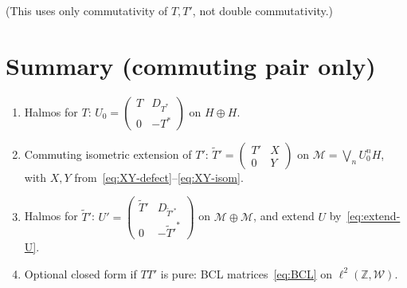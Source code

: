 \documentclass[11pt]{article}
\begin{document}
(This uses only commutativity of \(T,T'\), not double commutativity.)

\section*{Summary (commuting pair only)}

\begin{enumerate}
\item Halmos for \(T\):
\(\displaystyle U_0=\begin{pmatrix}T&D_{T^*}\\ 0&-T^*\end{pmatrix}\) on \(H\oplus H\).
\item Commuting isometric extension of \(T'\):
\(\displaystyle\widetilde{T}'=\begin{pmatrix}T'&X\\ 0&Y\end{pmatrix}\) on
\(\mathcal{M}=\bigvee_n U_0^n H\), with \(X,Y\) from~\eqref{eq:XY-defect}--\eqref{eq:XY-isom}.
\item Halmos for \(\widetilde{T}'\):
\(\displaystyle U'=\begin{pmatrix}\widetilde{T}'&D_{\widetilde{T}'^*}\\ 0&-{\widetilde{T}'}^*\end{pmatrix}\)
on \(\mathcal{M}\oplus\mathcal{M}\), and extend \(U\) by~\eqref{eq:extend-U}.
\item Optional closed form if \(TT'\) is pure: BCL matrices~\eqref{eq:BCL} on
\(\ell^2(\mathbb{Z},\mathcal{W})\).
\end{enumerate}
\end{document}
